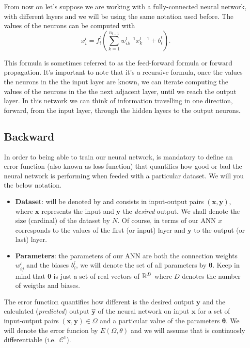 From now on let's suppose we are working with a fully-connected neural network,
with different layers and we will be using the same notation used before. The
values of the neurons can be computed with
\begin{equation}
  x_i^l = f_i^l \left( \sum_{k=1}^{n_{l-1}} w_{ik}^{l-1} x_{k}^{l-1} + b_i^l \right).
\end{equation}

This formula is sometimes referred to as the feed-forward formula or forward
propagation. It's important to note that it's a recursive formula, once the
values the neurons in the the input layer are known, we can iterate computing
the values of the neurons in the the next adjacent layer, until we reach the
output layer. In this network we can think of information travelling in one
direction, forward, from the input layer, through the hidden layers to the
output neurons.

\subsection{Backward}
\label{sec:backward}

In order to being able to train our neural network, is mandatory to define an
error function (also known as loss function) that quantifies how good or bad
the neural network is performing when feeded with a particular dataset. We will
you the below notation.
\begin{itemize}
  \item \textbf{Dataset}: will be denoted by and consists in input-output pairs
  \((\mathbf{x}, \mathbf{y})\), where \(\mathbf{x}\) represents the input and
  \(\mathbf{y}\) the \emph{desired} output. We shall denote the size (cardinal)
  of the dataset by \(N\). Of course, in terms of our ANN \(x\) corresponds to
  the values of the first (or input) layer and \(\mathbf{y}\) to the output (or
  last) layer.
  \item \textbf{Parameters}: the parameters of our ANN are both the connection
  weights \(w_{ij}^l\) and the biases \(b_i^l\), we will denote the set of all
  parameters by \(\bm{\theta}\). Keep in mind that \(\bm{\theta}\) is just a
  set of real vectors of \(\mathbb{R}^D\) where \(D\) denotes the number of weigths and
  biases.
\end{itemize}

The error function quantifies how different is the desired output
\(\mathbf{y}\) and the calculated (\emph{predicted}) output
\(\mathbf{\hat{y}}\) of the neural network on input \(\mathbf{x}\) for a set of
input-output pairs \((\mathbf{x}, \mathbf{y}) \in \Omega\) and a particular
value of the parameters \(\bm{\theta}\). We will denote the error funcion by
\(E(\Omega, \theta)\) and we will assume that is continuosly differentiable
(i.e.\ \(\mathcal{C}^1\)).


